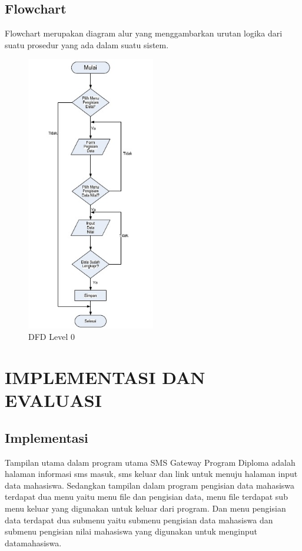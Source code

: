 \documentclass{jtetiproposalskripsi}
\begin{document}
\section{Flowchart}
Flowchart merupakan diagram alur yang menggambarkan urutan logika dari suatu prosedur yang ada dalam suatu sistem.
\begin{figure}[ht!]
  \centering
    \includegraphics[width=0.5\textwidth]{gambar/6}
    \caption{DFD Level 0}
    \label{wsn}
\end{figure}


\chapter{IMPLEMENTASI DAN EVALUASI}
\section{Implementasi}
Tampilan utama dalam program utama SMS Gateway Program Diploma adalah halaman informasi sms masuk, sms keluar dan link untuk menuju halaman input data mahasiswa. Sedangkan tampilan dalam program pengisian data mahasiswa terdapat dua menu yaitu menu file dan pengisian data, menu file terdapat sub menu keluar yang digunakan untuk keluar dari program. Dan menu pengisian data terdapat dua submenu yaitu submenu pengisian data mahasiswa dan submenu pengisian nilai mahasiswa yang digunakan untuk menginput datamahasiswa.
\end{document}
